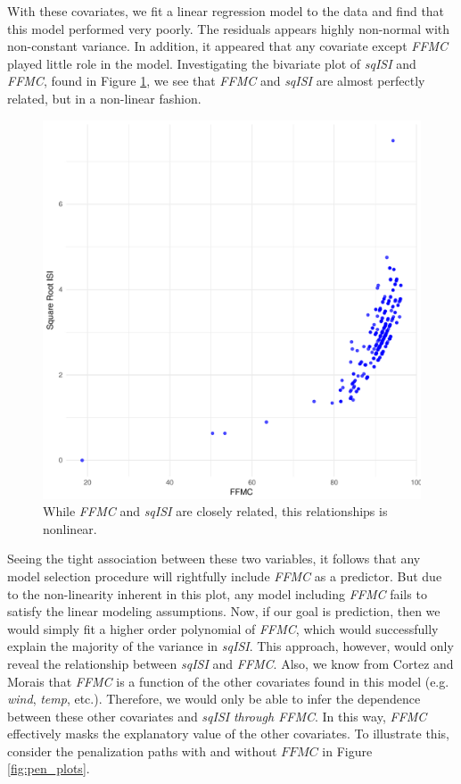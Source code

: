 \documentclass{article}
\begin{document}
With these covariates, we fit a linear regression model to the data and find that this model performed very poorly. The residuals appears highly non-normal with non-constant variance. In addition, it appeared that any covariate except \textit{FFMC} played little role in the model. Investigating the bivariate plot of \textit{sqISI} and \textit{FFMC}, found in Figure \ref{fig:FFMC_ISI_scatter}, we see that \textit{FFMC} and \textit{sqISI} are almost perfectly related, but in a non-linear fashion.  
\begin{figure}[h!]
\centering
\includegraphics[scale = 0.4]{FFMC_ISI_scatter.pdf}
\caption{While \textit{FFMC} and \textit{sqISI} are closely related, this relationships is nonlinear.}
\label{fig:FFMC_ISI_scatter}
\end{figure}
Seeing the tight association between these two variables, it follows that any model selection procedure will rightfully include \textit{FFMC} as a predictor. But due to the non-linearity inherent in this plot, any model including \textit{FFMC} fails to satisfy the linear modeling assumptions. Now, if our goal is prediction, then we would simply fit a higher order polynomial of \textit{FFMC}, which would successfully explain the majority of the variance in \textit{sqISI}. This approach, however, would only reveal the relationship between \textit{sqISI} and \textit{FFMC}. Also, we know from Cortez and Morais that \textit{FFMC} is a function of the other covariates found in this model (e.g. \textit{wind}, \textit{temp}, etc.). Therefore, we would only be able to infer the dependence between these other covariates and \textit{sqISI} \textit{through FFMC}. In this way, \textit{FFMC} effectively masks the explanatory value of the other covariates. To illustrate this, consider the penalization paths with and without $\textit{FFMC}$ in Figure \ref{fig:pen_plots}.
\end{document}
